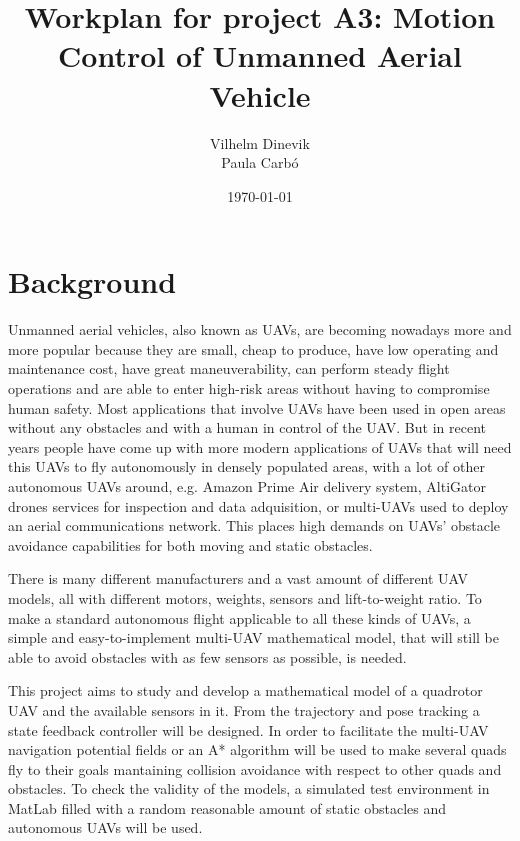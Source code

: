 \documentclass{article}
\title{Workplan for project A3: Motion Control of Unmanned Aerial Vehicle}
\author{Vilhelm Dinevik \\ Paula Carbó}
\date{\today}
\begin{document}
	\maketitle
	\section{Background}
		Unmanned aerial vehicles, also known as UAVs, are becoming nowadays more and more popular because they are small, cheap to produce, have low operating and maintenance cost, have great maneuverability, can perform steady flight operations and are able to enter high-risk areas without having to compromise human safety. Most applications that involve UAVs have been used in open areas without any obstacles and with a human in control of the UAV. But in recent years people have come up with more modern applications of UAVs that will need this UAVs to fly autonomously in densely populated areas, with a lot of other autonomous UAVs around, e.g. Amazon Prime Air delivery system, AltiGator drones services for inspection and data adquisition, or multi-UAVs used to deploy an aerial communications network. This places high demands on UAVs’ obstacle avoidance capabilities for both moving and static obstacles.
		
		\vspace{1em}
		There is many different manufacturers and a vast amount of different UAV models, all with different motors, weights, sensors and lift-to-weight ratio. To make a standard autonomous flight applicable to all these kinds of UAVs, a simple and easy-to-implement multi-UAV mathematical model, that will still be able to avoid obstacles with as few sensors as possible, is needed.  
		
		\vspace{1em}
		This project aims to study and develop a mathematical model of a quadrotor UAV and the available sensors in it.  From the trajectory and pose tracking a state feedback controller will be designed. In order to facilitate the multi-UAV navigation potential fields or an A* algorithm will be used to make several quads fly to their goals mantaining collision avoidance with respect to other quads and obstacles. To check the validity of the models, a simulated test environment in MatLab filled with a random reasonable amount of static obstacles and autonomous UAVs will be used.
		
		
		
\end{document}
